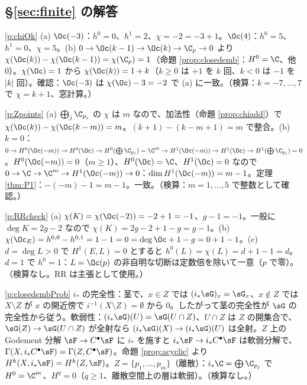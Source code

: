 \subsection*{§\ref{sec:finite} の解答}
\begin{sol}{\ref{p:chiOk}}
(a) $\Oc(-3)$：$h^0=0$、$h^1=2$、$\chi=-2=-3+1$。$\Oc(4)$：$h^0=5$、$h^1=0$、$\chi=5$。(b) $0\to\Oc(k-1)\to\Oc(k)\to\C_p\to0$ より $\chi(\Oc(k))-\chi(\Oc(k-1))=\chi(\C_p)=1$（命題 \ref{prop:closedemb}：$H^0=\C$、他 $0$）。$\chi(\Oc)=1$ から $\chi(\Oc(k))=1+k$（$k\ge0$ は $+1$ を $k$ 回、$k<0$ は $-1$ を $|k|$ 回）。確認：$\Oc(-3)$ は $\chi(\Oc)-3=-2$ で (a) に一致。（検算：$k=-7,\dots,7$ で $\chi=k+1$、窓計算。）
\end{sol}
\begin{sol}{\ref{p:Zpoints}}
(a) $\bigoplus_j\C_{p_j}$ の $\chi$ は $m$ なので、加法性（命題 \ref{prop:chiadd}）で $\chi(\Oc(k))-\chi(\Oc(k-m))=m$。$(k+1)-(k-m+1)=m$ で整合。(b) $k=0$：$0\to H^0(\Oc(-m))\to H^0(\Oc)\to H^0(\bigoplus\C_{p_j})=\C^m\to H^1(\Oc(-m))\to H^1(\Oc)\to H^1(\bigoplus\C_{p_j})=0$。$H^0(\Oc(-m))=0$（$m\ge1$）、$H^0(\Oc)=\C$、$H^1(\Oc)=0$ なので $0\to\C\to\C^m\to H^1(\Oc(-m))\to0$：$\dim H^1(\Oc(-m))=m-1$。定理 \ref{thm:P1}：$-(-m)-1=m-1$。一致。（検算：$m=1,\dots,5$ で整数として確認。）
\end{sol}
\begin{sol}{\ref{p:RRcheck}}
(a) $\chi(K)=\chi(\Oc(-2))=-2+1=-1$、$g-1=-1$。一般に $\deg K=2g-2$ なので $\chi(K)=2g-2+1-g=g-1$。(b) $\chi(\Oc_E)=h^{0,0}-h^{0,1}=1-1=0=\deg\Oc+1-g=0+1-1$。(c) $d=\deg L>0$ で $H^1(E,L)=0$ とすると $h^0(L)=\chi(L)=d+1-1=d$。$d=1$ で $h^0=1$：$L=\Oc(p)$ の非自明な切断は定数倍を除いて一意（$p$ で零）。（検算なし。RR は主張として使用。）
\end{sol}
\begin{sol}{\ref{p:closedembProb}}
$i_*$ の完全性：茎で、$x\in Z$ では $(i_*\sG)_x=\sG_x$、$x\notin Z$ では $X\setminus Z$ が $x$ の開近傍で $i^{-1}(X\setminus Z)=\emptyset$ から $0$。したがって茎の完全性が $\sG$ の完全性から従う。軟弱性：$(i_*\sG)(U)=\sG(U\cap Z)$、$U\cap Z$ は $Z$ の開集合で、$\sG(Z)\to\sG(U\cap Z)$ が全射なら $(i_*\sG)(X)\to(i_*\sG)(U)$ は全射。$Z$ 上の Godement 分解 $\sF\to C^\bullet\sF$ に $i_*$ を施すと $i_*\sF\to i_*C^\bullet\sF$ は軟弱分解で、$\Gamma(X,i_*C^\bullet\sF)=\Gamma(Z,C^\bullet\sF)$。命題 \ref{prop:acyclic} より $H^k(X,i_*\sF)=H^k(Z,\sF)$。$Z=\{p_1,\dots,p_m\}$（離散）：$i_*\C=\bigoplus\C_{p_j}$ で $H^0=\C^m$、$H^q=0$（$q\ge1$、離散空間上の層は軟弱）。（検算なし。）
\end{sol}

